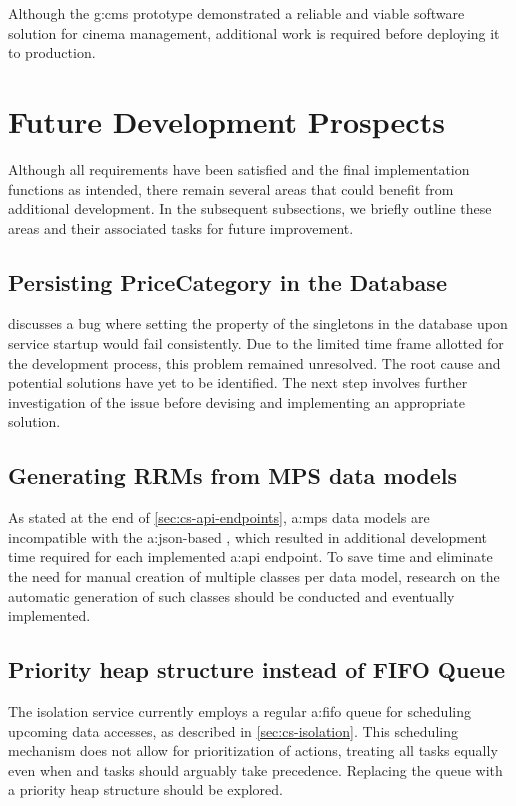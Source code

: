 Although the \gls{g:cms} prototype demonstrated a reliable and viable software solution for cinema management, additional work is required before deploying it to production.


\section{Future Development Prospects}
\label{sec:outlook}

Although all requirements have been satisfied and the final implementation functions as intended, there remain several areas that could benefit from additional development. In the subsequent subsections, we briefly outline these areas and their associated tasks for future improvement.

\subsection{Persisting PriceCategory in the Database}

 discusses a bug where setting the  property of the  singletons in the database upon service startup would fail consistently. Due to the limited time frame allotted for the development process, this problem remained unresolved. The root cause and potential solutions have yet to be identified. The next step involves further investigation of the issue before devising and implementing an appropriate solution.

\subsection{Generating RRMs from MPS data models}

As stated at the end of \cref{sec:cs-api-endpoints}, \gls{a:mps} data models are incompatible with the \gls{a:json}-based , which resulted in additional development time required for each implemented \gls{a:api} endpoint. To save time and eliminate the need for manual creation of multiple classes per data model, research on the automatic generation of such classes should be conducted and eventually implemented.

\subsection{Priority heap structure instead of FIFO Queue}

The isolation service currently employs a regular \gls{a:fifo} queue for scheduling upcoming data accesses, as described in \cref{sec:cs-isolation}. This scheduling mechanism does not allow for prioritization of actions, treating all tasks equally even when  and  tasks should arguably take precedence. Replacing the queue with a priority heap structure should be explored.

